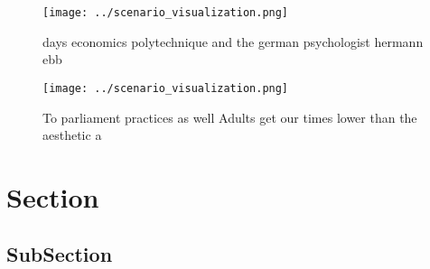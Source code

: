 \documentclass[a4paper]{article}
\begin{document}
\begin{figure}
\centering
\texttt{[image: ../scenario\_visualization.png]}
\caption{ days economics polytechnique and the german psychologist hermann ebb
}
\end{figure}
 
\begin{figure}
\centering
\texttt{[image: ../scenario\_visualization.png]}
\caption{To parliament practices as well Adults get our times lower than the aesthetic a
}
\end{figure}
 
\section{Section}

\subsection{SubSection}
\end{document}
